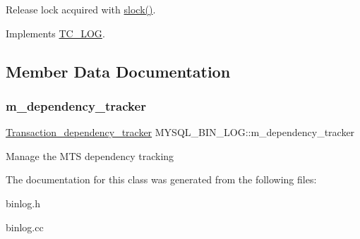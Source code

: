 Release lock acquired with \mbox{\hyperlink{classMYSQL__BIN__LOG_a189bd79b457e303f7c6ef936e3c932cf}{slock()}}. 

Implements \mbox{\hyperlink{classTC__LOG_ab383cdb4b722c9b11d284ac8b970b087}{T\+C\+\_\+\+L\+OG}}.



\subsection{Member Data Documentation}
\mbox{\label{classMYSQL__BIN__LOG_ada239ab6da56294fdcdd7aa30e9fdbfa}} 
\subsubsection{\texorpdfstring{m\+\_\+dependency\+\_\+tracker}{m\_dependency\_tracker}}
{\footnotesize\ttfamily \mbox{\hyperlink{classTransaction__dependency__tracker}{Transaction\+\_\+dependency\+\_\+tracker}} M\+Y\+S\+Q\+L\+\_\+\+B\+I\+N\+\_\+\+L\+O\+G\+::m\+\_\+dependency\+\_\+tracker}

Manage the M\+TS dependency tracking 

The documentation for this class was generated from the following files\+:\begin{DoxyCompactItemize}
\item 
binlog.\+h\item 
binlog.\+cc\end{DoxyCompactItemize}
